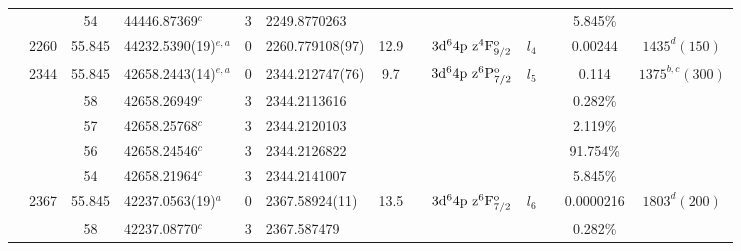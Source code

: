 \begin{table*}
\begin{center}
{\begin{tabular}{:l;l;c;l;c;l;c;l;l;c;c;c;c}
\rowstyle{\itshape}               &        & 54        & 44446.87369$^{c}$                & 3 &  2249.8770263      &      & $                                        $ & $                                        $ & $      $ &              & 5.845\%   & $     ^{}     $\\
                                  & 2260   & 55.845    & 44232.5390(19)$^{e,a}$           & 0 &   2260.779108(97)  & 12.9 & $                                        $ & $3\rm{d}^64\rm{p~z}^4\rm{F}_{9/2}^{\rm o}$ & $l_{4} $ &              & 0.00244   & $ 1435^{d}(150)$\\
                                  & 2344   & 55.845    & 42658.2443(14)$^{e,a}$           & 0 &   2344.212747(76)  &  9.7 & $                                        $ & $3\rm{d}^64\rm{p~z}^6\rm{P}_{7/2}^{\rm o}$ & $l_{5} $ &              & 0.114     & $ 1375^{b,c}(300)$\\
\rowstyle{\itshape}               &        & 58        & 42658.26949$^{c}$                & 3 &  2344.2113616      &      & $                                        $ & $                                        $ & $      $ &              & 0.282\%   & $     ^{}     $\\
\rowstyle{\itshape}               &        & 57        & 42658.25768$^{c}$                & 3 &  2344.2120103      &      & $                                        $ & $                                        $ & $      $ &              & 2.119\%   & $     ^{}     $\\
\rowstyle{\itshape}               &        & 56        & 42658.24546$^{c}$                & 3 &  2344.2126822      &      & $                                        $ & $                                        $ & $      $ &              & 91.754\%  & $     ^{}     $\\
\rowstyle{\itshape}               &        & 54        & 42658.21964$^{c}$                & 3 &  2344.2141007      &      & $                                        $ & $                                        $ & $      $ &              & 5.845\%   & $     ^{}     $\\
                                  & 2367   & 55.845    & 42237.0563(19)$^{a}$             & 0 &    2367.58924(11)  & 13.5 & $                                        $ & $3\rm{d}^64\rm{p~z}^6\rm{F}_{7/2}^{\rm o}$ & $l_{6} $ &              & 0.0000216 & $ 1803^{d}(200)$\\
\rowstyle{\itshape}               &        & 58        & 42237.08770$^{c}$                & 3 &   2367.587479      &      & $                                        $ & $                                        $ & $      $ &              & 0.282\%   & $     ^{}     $\\

\end{tabular}}
\end{center}
\end{table*}

